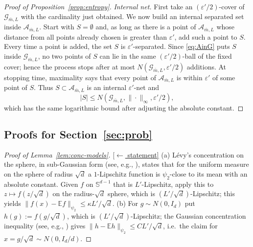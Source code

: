 \documentclass[11pt,reqno]{amsart}
\theoremstyle{plain}
\theoremstyle{definition}
\theoremstyle{remark}
\newcommand{\Sd}{\mathbb{S}^{d-1}}
\newcommand{\EE}{\mathbb{E}}
\newcommand{\eps}{\varepsilon}
\newcommand{\GG}{\mathcal{G}}
\newcommand{\AAA}{\mathcal{A}}
\newcommand{\stmtbutton}[1]{\hyperref[#1]{\textnormal{\footnotesize\textsf{[$\leftarrow$ statement]}}}}
\begin{document}
\begin{proof}[Proof of Proposition~\textup{\ref{prop:entropy}}]
\emph{Internal net.} First take an $(\eps'/2)$-cover of $\GG_{\bar m,L}$ with the cardinality just obtained. We now build an internal separated set inside $\AAA_{\bar m,L}$. Start with $S=\emptyset$ and, as long as there is a point of $\AAA_{\bar m,L}$ whose distance from all points already chosen is greater than $\eps'$, add such a point to $S$. Every time a point is added, the set $S$ is $\eps'$-separated. Since \eqref{eq:AinG} puts $S$ inside $\GG_{\bar m,L}$, no two points of $S$ can lie in the same $(\eps'/2)$-ball of the fixed cover; hence the process stops after at most $N(\GG_{\bar m,L},\eps'/2)$ additions. At stopping time, maximality says that every point of $\AAA_{\bar m,L}$ is within $\eps'$ of some point of $S$. Thus $S\subset\AAA_{\bar m,L}$ is an internal $\eps'$-net and
\[
        |S|\le N(\GG_{\bar m,L},\|\cdot\|_\infty,\eps'/2),
\]
which has the same logarithmic bound after adjusting the absolute constant.

\end{proof}

\subsection{Proofs for Section~\ref{sec:prob}}

\begin{proof}[Proof of Lemma~\textup{\ref{lem:conc-models}}]\label{proof:conc-models}\stmtbutton{lem:conc-models}
(a) L\'evy's concentration on the sphere, in sub-Gaussian form (see, e.g., \cite[Ch.~5]{Vershynin}), states that for the uniform measure on the sphere of radius $\sqrt d$ a $1$-Lipschitz function is $\psi_2$-close to its mean with an absolute constant. Given $f$ on $\Sd$ that is $L'$-Lipschitz, apply this to $z\mapsto f(z/\sqrt d)$ on the radius-$\sqrt d$ sphere, which is $(L'/\sqrt d)$-Lipschitz; this yields $\|f(x)-\EE f\|_{\psi_2}\le\kappa L'/\sqrt d$. (b) For $g\sim N(0,I_d)$ put $h(g):=f(g/\sqrt d)$, which is $(L'/\sqrt d)$-Lipschitz; the Gaussian concentration inequality (see, e.g., \cite[Ch.~5]{Vershynin}) gives $\|h-\EE h\|_{\psi_2}\le C L'/\sqrt d$, i.e.\ the claim for $x=g/\sqrt d\sim N(0,I_d/d)$.
\end{proof}
\end{document}
